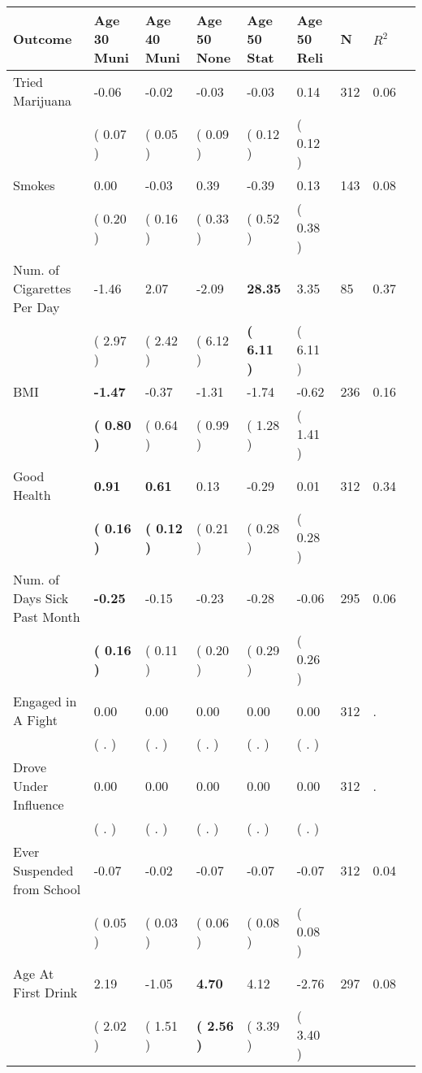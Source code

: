 \begin{tabular}{L{6.2cm} C{1.8cm} C{1.8cm} C{1.8cm} C{1.8cm} C{1.8cm} C{1.8cm} C{0.3cm} C{0.3cm}}
\toprule
 \textbf{Outcome} & \textbf{Age 30 Muni} & \textbf{Age 40 Muni} & \textbf{Age 50 None} & \textbf{Age 50 Stat} & \textbf{Age 50 Reli} & \textbf{N} & \textbf{$ R^2$} \\
\midrule
Tried Marijuana &     -0.06 &     -0.02 &     -0.03 &     -0.03 &      0.14  & 312 &       0.06 \\ 
 & (     0.07 ) & (     0.05 ) & (     0.09 ) & (     0.12 ) & (     0.12 )  & \\
Smokes &      0.00 &     -0.03 &      0.39 &     -0.39 &      0.13  & 143 &       0.08 \\ 
 & (     0.20 ) & (     0.16 ) & (     0.33 ) & (     0.52 ) & (     0.38 )  & \\
Num. of Cigarettes Per Day &     -1.46 &      2.07 &     -2.09 & \textbf{    28.35} &      3.35  & 85 &       0.37 \\ 
 & (     2.97 ) & (     2.42 ) & (     6.12 ) & \textbf{(     6.11 )} & (     6.11 )  & \\
BMI & \textbf{    -1.47} &     -0.37 &     -1.31 &     -1.74 &     -0.62  & 236 &       0.16 \\ 
 & \textbf{(     0.80 )} & (     0.64 ) & (     0.99 ) & (     1.28 ) & (     1.41 )  & \\
Good Health & \textbf{     0.91} & \textbf{     0.61} &      0.13 &     -0.29 &      0.01  & 312 &       0.34 \\ 
 & \textbf{(     0.16 )} & \textbf{(     0.12 )} & (     0.21 ) & (     0.28 ) & (     0.28 )  & \\
Num. of Days Sick Past Month & \textbf{    -0.25} &     -0.15 &     -0.23 &     -0.28 &     -0.06  & 295 &       0.06 \\ 
 & \textbf{(     0.16 )} & (     0.11 ) & (     0.20 ) & (     0.29 ) & (     0.26 )  & \\
Engaged in A Fight &      0.00 &      0.00 &      0.00 &      0.00 &      0.00  & 312 &          . \\ 
 & (        . ) & (        . ) & (        . ) & (        . ) & (        . )  & \\
Drove Under Influence &      0.00 &      0.00 &      0.00 &      0.00 &      0.00  & 312 &          . \\ 
 & (        . ) & (        . ) & (        . ) & (        . ) & (        . )  & \\
Ever Suspended from School &     -0.07 &     -0.02 &     -0.07 &     -0.07 &     -0.07  & 312 &       0.04 \\ 
 & (     0.05 ) & (     0.03 ) & (     0.06 ) & (     0.08 ) & (     0.08 )  & \\
Age At First Drink &      2.19 &     -1.05 & \textbf{     4.70} &      4.12 &     -2.76  & 297 &       0.08 \\ 
 & (     2.02 ) & (     1.51 ) & \textbf{(     2.56 )} & (     3.39 ) & (     3.40 )  & \\
\bottomrule
\end{tabular}
